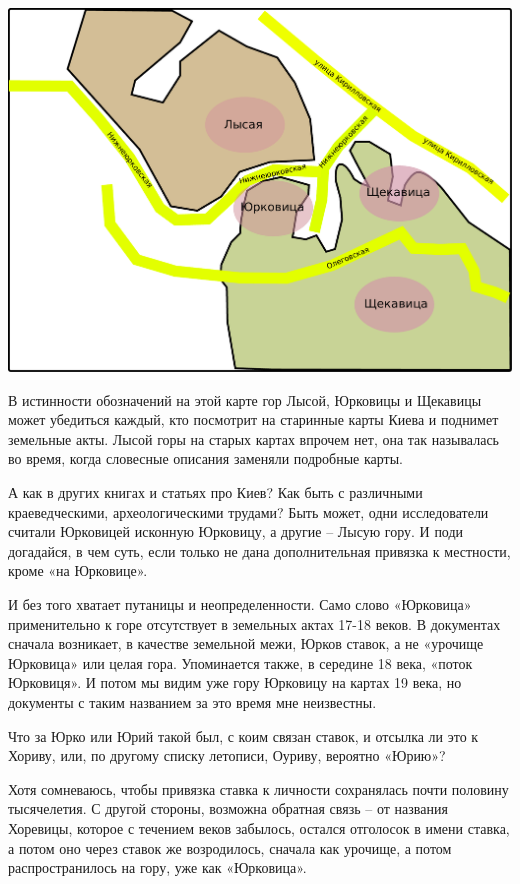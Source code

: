 \begin{center}
\includegraphics[width=\linewidth]{chast-kirvys/poisk-yourk/yourk-pravilno.pdf}
\end{center} 

В истинности обозначений на этой карте гор Лысой, Юрковицы и Щекавицы может убедиться каждый, кто посмотрит на старинные карты Киева и поднимет земельные акты. Лысой горы на старых картах впрочем нет, она так называлась во время, когда словесные описания заменяли подробные карты.

А как в других книгах и статьях про Киев? Как быть с различными краеведческими, археологическими трудами? Быть может, одни исследователи считали Юрковицей исконную Юрковицу, а другие – Лысую гору. И поди догадайся, в чем суть, если только не дана дополнительная привязка к местности, кроме «на Юрковице».

И без того хватает путаницы и неопределенности. Само слово «Юрковица» применительно к горе отсутствует в земельных актах 17-18 веков. В документах сначала возникает, в качестве земельной межи, Юрков ставок, а не «урочище Юрковица» или целая гора. Упоминается также, в середине 18 века, «поток Юрковиця». И потом мы видим уже гору Юрковицу на картах 19 века, но документы с таким названием за это время мне неизвестны.

Что за Юрко или Юрий такой был, с коим связан ставок, и отсылка ли это к Хориву, или, по другому списку летописи, Оуриву, вероятно «Юрию»? 

Хотя сомневаюсь, чтобы привязка ставка к личности сохранялась почти половину тысячелетия. С другой стороны, возможна обратная связь – от названия Хоревицы, которое с течением веков забылось, остался отголосок в имени ставка, а потом оно через ставок же возродилось, сначала как урочище, а потом распространилось на гору, уже как «Юрковица».

